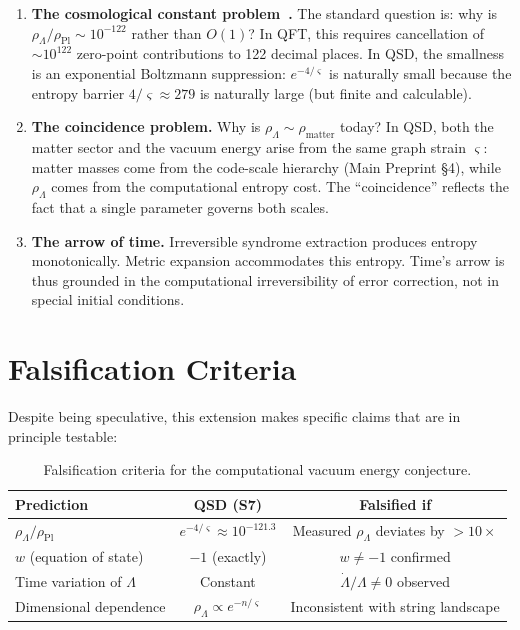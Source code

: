 \documentclass[11pt,a4paper]{article}
\theoremstyle{definition}
\newcommand{\strain}{\varsigma}            %
\newcommand{\rhoL}{\rho_{\Lambda}}
\newcommand{\rhoPl}{\rho_{\text{Pl}}}
\begin{document}
\begin{enumerate}
    \item \textbf{The cosmological constant problem~\cite{Weinberg1989}.} The standard question is: why is $\rhoL/\rhoPl \sim 10^{-122}$ rather than $O(1)$? In QFT, this requires cancellation of $\sim 10^{122}$ zero-point contributions to 122 decimal places. In QSD, the smallness is an exponential Boltzmann suppression: $e^{-4/\strain}$ is naturally small because the entropy barrier $4/\strain \approx 279$ is naturally large (but finite and calculable).

    \item \textbf{The coincidence problem.} Why is $\rhoL \sim \rho_{\text{matter}}$ today? In QSD, both the matter sector and the vacuum energy arise from the same graph strain $\strain$: matter masses come from the code-scale hierarchy (Main Preprint \S4), while $\rhoL$ comes from the computational entropy cost. The ``coincidence'' reflects the fact that a single parameter governs both scales.

    \item \textbf{The arrow of time.} Irreversible syndrome extraction produces entropy monotonically. Metric expansion accommodates this entropy. Time's arrow is thus grounded in the computational irreversibility of error correction, not in special initial conditions.
\end{enumerate}


\section{Falsification Criteria}

Despite being speculative, this extension makes specific claims that are in principle testable:

\begin{table}[h]
\centering
\begin{tabular}{p{5cm}cc}
\toprule
\textbf{Prediction} & \textbf{QSD (S7)} & \textbf{Falsified if} \\
\midrule
$\rhoL/\rhoPl$ & $e^{-4/\strain} \approx 10^{-121.3}$ & Measured $\rhoL$ deviates by ${>}10\times$ \\
$w$ (equation of state) & $-1$ (exactly) & $w \neq -1$ confirmed \\
Time variation of $\Lambda$ & Constant & $\dot{\Lambda}/\Lambda \neq 0$ observed \\
Dimensional dependence & $\rhoL \propto e^{-n/\strain}$ & Inconsistent with string landscape \\
\bottomrule
\end{tabular}
\caption{Falsification criteria for the computational vacuum energy conjecture.}
\end{table}
\end{document}
